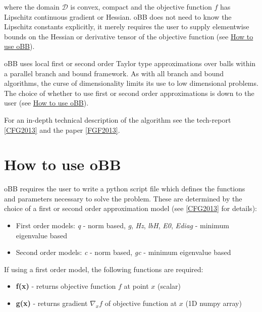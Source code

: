 \documentclass[letterpaper,11pt,openany,oneside]{sphinxmanual}
\begin{document}
where the domain $\mathcal{D}$ is convex, compact and the objective function $f$ has Lipschitz continuous gradient or Hessian. oBB does not need to know the Lipschitz constants explicitly, it merely requires the user to supply elementwise bounds on the Hessian or derivative tensor of the objective function (see {\hyperref[userguide:how-to-use-obb]{How to use oBB}}).

oBB uses local first or second order Taylor type approximations over balls within a parallel branch and bound framework. As with all branch and bound algorithms, the curse of dimensionality limits its use to low dimensional problems. The choice of whether to use first or second order approximations is down to the user  (see {\hyperref[userguide:how-to-use-obb]{How to use oBB}}).

For an in-depth technical description of the algorithm see the tech-report {\hyperref[userguide:cfg2013]{{[}CFG2013{]}}} and the paper {\hyperref[userguide:fgf2013]{{[}FGF2013{]}}}.


\section{How to use oBB}
\label{userguide:how-to-use-obb}
oBB requires the user to write a python script file which defines the functions and parameters necessary to solve the problem. These are determined by the choice of a first or second order approximation model (see {\hyperref[userguide:cfg2013]{{[}CFG2013{]}}} for details):
\begin{itemize}
\item {} 
First order models: \emph{q} - norm based,  \emph{g}, \emph{Hz}, \emph{lbH}, \emph{E0}, \emph{Ediag} - minimum eigenvalue based

\item {} 
Second order models: \emph{c} - norm based, \emph{gc} - minimum eigenvalue based

\end{itemize}

If using a first order model, the following functions are required:
\begin{itemize}
\item {} 
\textbf{f(x)} - returns objective function $f$ at point $x$ (scalar)

\item {} 
\textbf{g(x)} - returns gradient $\nabla_x f$ of objective function at $x$ (1D numpy array)

\end{itemize}
\end{document}
